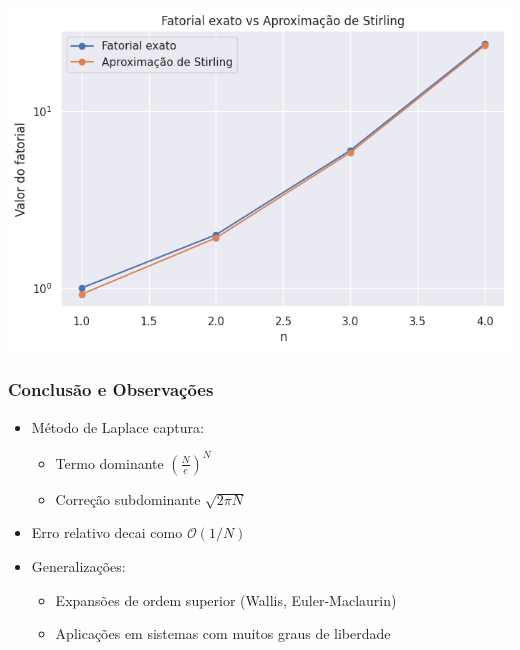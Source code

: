 \documentclass[11pt]{beamer}
\begin{document}
\begin{frame}
  \includegraphics[scale=0.5]{stirling.png}
\end{frame}
\begin{frame}
\frametitle{Conclusão e Observações}
\begin{itemize}
\item Método de Laplace captura: 
\begin{itemize}
\item Termo dominante \( \left( \frac{N}{e} \right)^N \)
\item Correção subdominante \( \sqrt{2\pi N} \)
\end{itemize}

\item Erro relativo decai como \( \mathcal{O}(1/N) \)
\item Generalizações:
\begin{itemize}
\item Expansões de ordem superior (Wallis, Euler-Maclaurin)
\item Aplicações em sistemas com muitos graus de liberdade
\end{itemize}
\end{itemize}
\end{frame}



%
%
%
%
%
\end{document}
